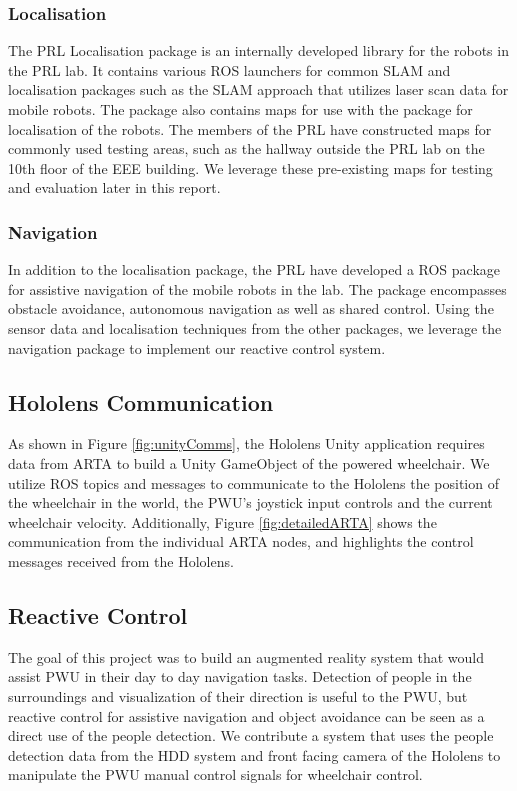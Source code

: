 \subsubsection{Localisation}
The PRL Localisation package is an internally developed library for the robots in the PRL lab. It contains various ROS launchers for common SLAM and localisation packages such as the  SLAM approach that utilizes laser scan data for mobile robots. The package also contains maps for use with the  package for localisation of the robots. The members of the PRL have  constructed maps for commonly used testing areas, such as the hallway outside the PRL lab on the 10th floor of the EEE building. We leverage these pre-existing maps for testing and evaluation later in this report.

\subsubsection{Navigation}
In addition to the localisation package, the PRL have developed a ROS package for assistive navigation of the mobile robots in the lab. The package encompasses obstacle avoidance, autonomous navigation as well as shared control. Using the sensor data and localisation techniques from the other packages, we leverage the navigation package to implement our reactive control system.

\subsection{Hololens Communication}
As shown in Figure \ref{fig:unityComms}, the Hololens Unity application requires data from ARTA to build a Unity GameObject of the powered wheelchair. We utilize ROS topics and messages to communicate to the Hololens the position of the wheelchair in the world, the PWU's joystick input controls and the current wheelchair velocity. Additionally, Figure \ref{fig:detailedARTA} shows the communication from the individual ARTA nodes, and highlights the control messages received from the Hololens.

\subsection{Reactive Control}
The goal of this project was to build an augmented reality system that would assist PWU in their day to day navigation tasks. Detection of people in the surroundings and visualization of their direction is useful to the PWU, but reactive control for assistive navigation and object avoidance can be seen as a direct use of the people detection. We contribute a system that uses the people detection data from the HDD system and front facing camera of the Hololens to manipulate the PWU manual control signals for wheelchair control.

